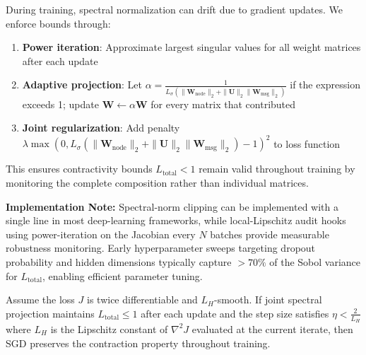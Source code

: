 \documentclass{article}
\begin{document}
\begin{remark}
During training, spectral normalization can drift due to gradient updates. We enforce bounds through:
\begin{enumerate}
\item \textbf{Power iteration}: Approximate largest singular values for all weight matrices after each update
\item \textbf{Adaptive projection}: Let $\alpha = \frac{1}{L_\sigma(\|\mathbf{W}_{\text{node}}\|_2 + \|\mathbf{U}\|_2\|\mathbf{W}_{\text{msg}}\|_2)}$ if the expression exceeds 1; update $\mathbf{W} \leftarrow \alpha \mathbf{W}$ for every matrix that contributed
\item \textbf{Joint regularization}: Add penalty $\lambda \max(0, L_\sigma(\|\mathbf{W}_{\text{node}}\|_2 + \|\mathbf{U}\|_2 \|\mathbf{W}_{\text{msg}}\|_2) - 1)^2$ to loss function
\end{enumerate}
This ensures contractivity bounds $L_{\text{total}} < 1$ remain valid throughout training by monitoring the complete composition rather than individual matrices.

\textbf{Implementation Note:} Spectral-norm clipping can be implemented with a single line in most deep-learning frameworks, while local-Lipschitz audit hooks using power-iteration on the Jacobian every $N$ batches provide measurable robustness monitoring. Early hyperparameter sweeps targeting dropout probability and hidden dimensions typically capture $>70\%$ of the Sobol variance for $L_{\text{total}}$, enabling efficient parameter tuning.
\end{remark}


\begin{lemma}
Assume the loss $J$ is twice differentiable and $L_H$-smooth. If joint spectral projection maintains $L_{\text{total}} \leq 1$ after each update and the step size satisfies $\eta < \frac{2}{L_H}$ where $L_H$ is the Lipschitz constant of $\nabla^2 J$ evaluated at the current iterate, then SGD preserves the contraction property throughout training.
\end{lemma}

\end{document}

